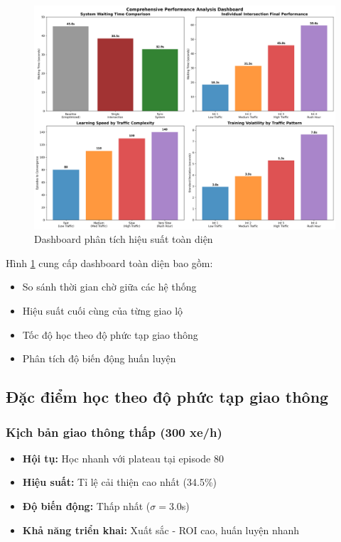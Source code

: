\begin{figure}[!htp]
    \centering
    \includegraphics[width=\textwidth]{figures/03_performance_dashboard.png}
    \caption{Dashboard phân tích hiệu suất toàn diện}
    \label{fig:performance_dashboard}
\end{figure}

Hình \ref{fig:performance_dashboard} cung cấp dashboard toàn diện bao gồm:
\begin{itemize}
    \item So sánh thời gian chờ giữa các hệ thống
    \item Hiệu suất cuối cùng của từng giao lộ
    \item Tốc độ học theo độ phức tạp giao thông
    \item Phân tích độ biến động huấn luyện
\end{itemize}

\subsection{Đặc điểm học theo độ phức tạp giao thông}

\subsubsection{Kịch bản giao thông thấp (300 xe/h)}
\begin{itemize}
    \item \textbf{Hội tụ:} Học nhanh với plateau tại episode 80
    \item \textbf{Hiệu suất:} Tỉ lệ cải thiện cao nhất (34.5\%)
    \item \textbf{Độ biến động:} Thấp nhất ($\sigma = 3.0$s)
    \item \textbf{Khả năng triển khai:} Xuất sắc - ROI cao, huấn luyện nhanh
\end{itemize}


